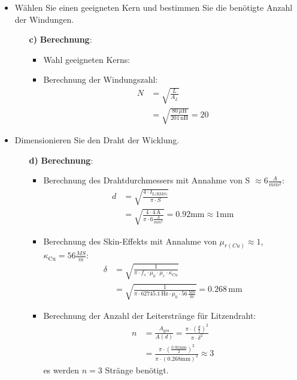 \documentclass{article}
\begin{document}
\begin{enumerate}
\begin{itemize}
        \item Wählen Sie einen geeigneten Kern und bestimmen Sie die benötigte Anzahl der Windungen.
        \begin{enumerate}
            \item[\textbf{c)}] \textbf{Berechnung}:
        \begin{itemize}
            \item Wahl geeigneten Kerns: 
            \item Berechnung der Windungszahl:
            \begin{align*}
                N &= \sqrt{\frac{L}{A_L}} \\
                  &= \sqrt{\frac{80 \, \mu\text{H}}{201 \, \text{nH}}} = 20
            \end{align*}                
        \end{itemize}
        \hfill \break
        \end{enumerate}

        \item Dimensionieren Sie den Draht der Wicklung.
        \begin{enumerate}
            \item[\textbf{d)}] \textbf{Berechnung}:
        \begin{itemize}
            \item Berechnung des Drahtdurchmessers mit Annahme von S \(\approx 6 \frac{A}{mm^2} \):
            \begin{align*}
                d &= \sqrt{\frac{4 \cdot I_{\text{L(RMS)}}}{\pi \cdot S}} \\
                &= \sqrt{\frac{4 \cdot 4\,\text{A}}{\pi \cdot 6 \frac{A}{mm^2} }} = 0.92\text{mm} \approx 1\text{mm}
            \end{align*}

            \item Berechnung des Skin-Effekts mit Annahme von \(\mu_{r(Cu)} \approx 1\), \(\kappa_{\text{Cu}} = 56 \frac{MS}{m}\):
            \begin{align*}
                \delta &= \sqrt{\frac{1}{\pi \cdot f_s \cdot \mu_0 \cdot \mu_r \cdot \kappa_{\text{Cu}}}} \\
                &= \sqrt{\frac{1}{\pi \cdot 62745.1\,\text{Hz} \cdot \mu_0 \cdot 56\,\frac{\text{MS}}{\text{m}}}} = 0.268\,\text{mm}
            \end{align*}

            \item Berechnung der Anzahl der Leiterstränge für Litzendraht:
            \begin{align*}
                n &= \frac{A_{\text{ges}}}{A(d)} = \frac{\pi \cdot \left(\frac{d}{2}\right)^2}{\pi \cdot \delta^2} \\
                &= \frac{\pi \cdot \left(\frac{0.92\,\text{mm}}{2}\right)^2}{\pi \cdot (0.268\text{mm})^2} \approx 3
            \end{align*}
            es werden $n = 3$ Stränge benötigt.
        \end{itemize}
        \end{enumerate}


\end{itemize}
\end{enumerate}
\end{document}
